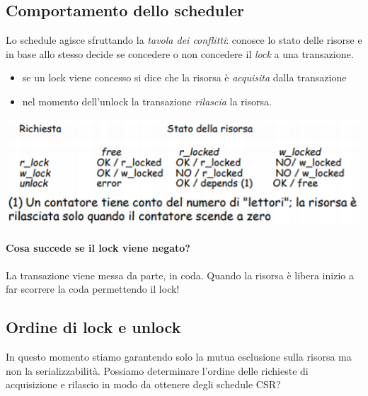 \subsection{Comportamento dello scheduler}
Lo schedule agisce sfruttando la \emph{tavola dei conflitti}: conosce lo stato delle risorse e in base allo stesso decide se concedere o non concedere il \emph{lock} a una transazione.
\begin{itemize}
	\item se un lock viene concesso si dice che la risorsa è \emph{acquisita} dalla transazione
	\item nel momento dell'unlock la transazione \emph{rilascia} la risorsa.
\end{itemize}
\begin{center}\includegraphics{images/162.PNG}\end{center}

\paragraph{Cosa succede se il lock viene negato?} La transazione viene messa da parte, in coda. Quando la risorsa è libera inizio a far scorrere la coda permettendo il lock!

\subsection{Ordine di lock e unlock} In questo momento stiamo garantendo solo la mutua esclusione sulla risorsa ma non la serializzabilità. Possiamo determinare l'ordine delle richieste di acquisizione e rilascio in modo da ottenere degli schedule CSR?
